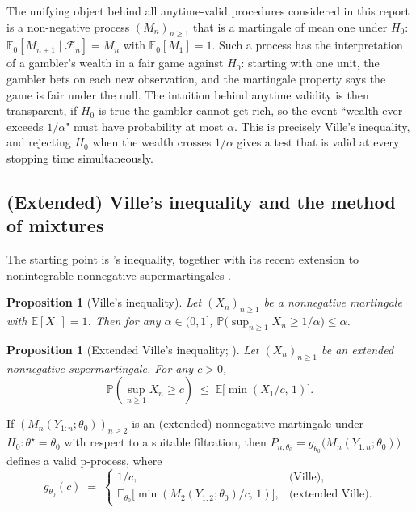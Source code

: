 \documentclass{article}%
\newtheorem{proposition}[theorem]{Proposition}
\newcommand{\E}{\mathbb{E}}
\newcommand{\Prob}{\mathbb{P}}
\newcommand{\1}{\mathbf{1}}
\begin{document}
The unifying object behind all anytime-valid procedures considered in
this report is a non-negative process \((M_n)_{n\geq 1}\) that is a
martingale of mean one under \(H_0\): \(\E_0[M_{n+1}\mid\mathcal{F}_n]
=M_n\) with \(\E_0[M_1]=1\). Such a process has the interpretation of a
gambler's wealth in a fair game against \(H_0\): starting with one
unit, the gambler bets on each new observation, and the martingale
property says the game is fair under the null. The intuition behind
anytime validity is then transparent, if \(H_0\) is true the gambler
cannot get rich, so the event ``wealth ever exceeds \(1/\alpha\)" must
have probability at most \(\alpha\). This is precisely Ville's
inequality, and rejecting \(H_0\) when the wealth crosses \(1/\alpha\)
gives a test that is valid at every stopping time simultaneously.

\subsection{(Extended) Ville's inequality and the method of mixtures}

The starting point is \cite{ville1939etude}'s inequality, together with its recent extension to nonintegrable nonnegative supermartingales
\citep{wang2025extended}.

\begin{proposition}[Ville's inequality]\label{prop:ville}
Let \((X_n)_{n\geq 1}\) be a nonnegative martingale with
\(\E[X_1]=1\). Then for any \(\alpha\in(0,1]\),
\(\Prob\bigl(\sup_{n\geq 1} X_n\geq 1/\alpha\bigr)\leq\alpha\).
\end{proposition}

\begin{proposition}[Extended Ville's inequality;
{\cite[Thm.~4.1]{wang2025extended}}]
\label{prop:eville}
Let \((X_n)_{n\geq 1}\) be an extended nonnegative supermartingale.
For any \(c>0\),
\[
   \Prob\left(\sup_{n\geq 1} X_n\geq c\right)\;\leq\;
   \E\!\bigl[\min(X_1/c,\,1)\bigr].
\]
\end{proposition}

If \((M_n(Y_{1:n};\theta_0))_{n\geq 2}\) is an (extended) nonnegative
martingale under \(H_0:\theta^\star=\theta_0\) with respect to a
suitable filtration, then
\(P_{n,\theta_0}=g_{\theta_0}\bigl(M_n(Y_{1:n};\theta_0)\bigr)\)
defines a valid p-process, where
\begin{equation}\label{eq:gtheta0}
  g_{\theta_0}(c)\;=\;
   \begin{cases}
     1/c, & \text{(Ville)},\\[2pt]
     \E_{\theta_0}\!\bigl[\min(M_2(Y_{1:2};\theta_0)/c,\,1)\bigr],
       & \text{(extended Ville)}.
   \end{cases}
\end{equation}
\end{document}
